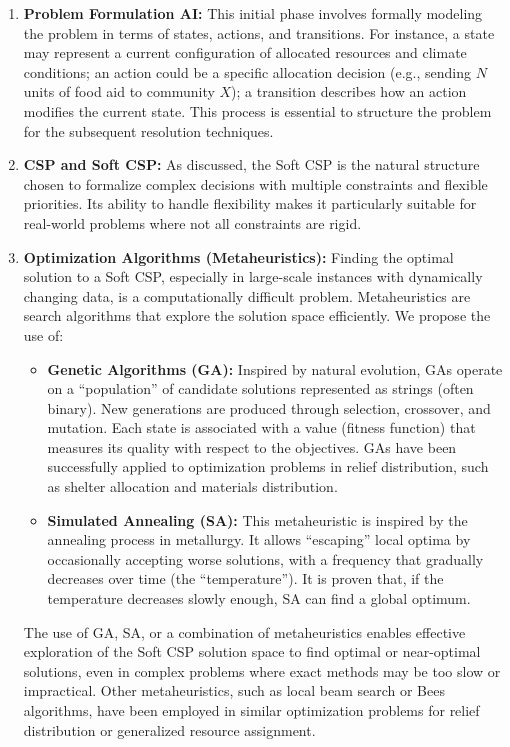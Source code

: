 \begin{enumerate}
    \item \textbf{Problem Formulation AI:} This initial phase involves formally modeling the problem in terms of states, actions, and transitions. For instance, a state may represent a current configuration of allocated resources and climate conditions; an action could be a specific allocation decision (e.g., sending $N$ units of food aid to community $X$); a transition describes how an action modifies the current state. This process is essential to structure the problem for the subsequent resolution techniques.

    \item \textbf{CSP and Soft CSP:} As discussed, the Soft CSP is the natural structure chosen to formalize complex decisions with multiple constraints and flexible priorities. Its ability to handle flexibility makes it particularly suitable for real-world problems where not all constraints are rigid.

    \item \textbf{Optimization Algorithms (Metaheuristics):} Finding the optimal solution to a Soft CSP, especially in large-scale instances with dynamically changing data, is a computationally difficult problem. Metaheuristics are search algorithms that explore the solution space efficiently. We propose the use of:
    \begin{itemize}
        \item \textbf{Genetic Algorithms (GA):} Inspired by natural evolution, GAs operate on a “population” of candidate solutions represented as strings (often binary). New generations are produced through selection, crossover, and mutation. Each state is associated with a value (fitness function) that measures its quality with respect to the objectives. GAs have been successfully applied to optimization problems in relief distribution, such as shelter allocation and materials distribution.
        \item \textbf{Simulated Annealing (SA):} This metaheuristic is inspired by the annealing process in metallurgy. It allows “escaping” local optima by occasionally accepting worse solutions, with a frequency that gradually decreases over time (the “temperature”). It is proven that, if the temperature decreases slowly enough, SA can find a global optimum.
    \end{itemize}
    The use of GA, SA, or a combination of metaheuristics enables effective exploration of the Soft CSP solution space to find optimal or near-optimal solutions, even in complex problems where exact methods may be too slow or impractical. Other metaheuristics, such as local beam search or Bees algorithms, have been employed in similar optimization problems for relief distribution or generalized resource assignment.


\end{enumerate}
